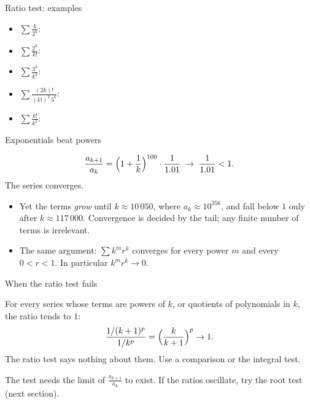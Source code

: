 \documentclass{wosm-slides}
\begin{document}
\begin{frame}{Ratio test: examples}
  \begin{itemize}
    \item $\displaystyle\sum \frac{k}{2^k}$:
    \item $\displaystyle\sum \frac{2^k}{k!}$:
    \item $\displaystyle\sum \frac{3^k}{k^3}$:
    \item $\displaystyle\sum \frac{(2k)!}{(k!)^2\, 5^k}$:
    \item $\displaystyle\sum \frac{k!}{k^k}$:
  \end{itemize}
\end{frame}

\begin{frame}{Exponentials beat powers}
  \begin{example}
    \[ \frac{a_{k+1}}{a_k} = \Bigl(1 + \frac1k\Bigr)^{100} \cdot \frac{1}{1.01}
       \;\to\; \frac{1}{1.01} < 1 . \]
    The series converges.
  \end{example}
  \pause
  \begin{itemize}
    \item Yet the terms \emph{grow} until $k \approx 10\,050$, where $a_k \approx 10^{356}$,
      and fall below $1$ only after $k \approx 117\,000$.
      Convergence is decided by the tail; any finite number of terms is irrelevant.
    \item The same argument: $\sum k^m r^k$ converges for every power $m$ and every
      $0 < r < 1$. In particular $k^m r^k \to 0$.
  \end{itemize}
\end{frame}

\begin{frame}{When the ratio test fails}
  \begin{warning}[$L = 1$]
    For every series whose terms are powers of $k$, or quotients of polynomials in $k$,
    the ratio tends to $1$:
    \[ \frac{1/(k+1)^p}{1/k^p} = \Bigl(\frac{k}{k+1}\Bigr)^p \to 1 . \]
    The ratio test says nothing about them. Use a comparison or the integral test.
  \end{warning}
  \pause
  \begin{warning}[No limit]
    The test needs the limit of $\frac{a_{k+1}}{a_k}$ to exist.
    If the ratios oscillate, try the root test (next section).
  \end{warning}
\end{frame}
\end{document}
